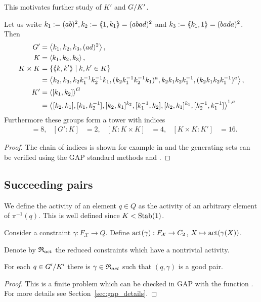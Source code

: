 \documentclass[a4paper,11pt]{amsart}
\begin{document}
This motivates further study of $K'$ and ${G/K'}$.
\begin{lem} \label{lem:subgroupsOfG}
Let us write $k_1 := (ab)^2, k_2:=\langle\negthickspace\langle1,k_1\rangle\negthickspace\rangle = (abad)^2$ and $k_3:=\langle\negthickspace\langle k_1,1\rangle\negthickspace\rangle = (bada)^2$. Then 
 \begin{align*}
  G' &= \left< k_1,k_2,k_3,(ad)^2\right>, \\
  K &= \left< k_1,k_2,k_3\right>, \\
  K\times K &= \{\langle\negthickspace\langle k,k'\rangle\negthickspace\rangle \mid k,k'\in K\} \\&= \left< k_2,k_3,k_2k_1^{-1}k_2^{-1}k_1,(k_2k_1^{-1}k_2^{-1}k_1)^a,k_2k_1k_2k_1^{-1},(k_2k_1k_2k_1^{-1})^a  \right>,\\
  K' &= \left< [k_1,k_2] \right>^G \\ 
  &= \left<[k_2,k_1],[k_1,k_2^{-1}],[k_2,k_1]^{k_2},[k_1^{-1},k_2], [k_2,k_1]^{k_1},[k_2^{-1},k_1^{-1}]\right>^{1,a} 
 \end{align*}
Furthermore these groups form a tower with indices
\begin{align*}
  [G:G']&=8, & [G':K]&=2, &[K:K\times K]&= 4, &[K\times K:K']&=16. 
\end{align*}
\end{lem}
\begin{proof}
 The chain of indices is shown for example in \cite{Bartholdi:BranchGroups} and the generating sets can be verified using the GAP standard methods
  and . 
\end{proof}

\subsection{Succeeding pairs}
\begin{defi}
 We define the activity of an element $q\in Q$ as the activity of an arbitrary element of $\pi^{-1}(q)$. 
 This is well defined since $K<\operatorname{Stab}(1)$. 
 
 Consider a constraint $\gamma\colon F_{\mathcal{X}} \to Q$. 
 Define $\operatorname{act}(\gamma): F_{\mathcal{X}}\to C_2$, $X \mapsto \operatorname{act}(\gamma(X))$.
 
 Denote by $\mathfrak{R}_{act}$ the reduced constraints which have a nontrivial activity.
\end{defi}

\begin{lem} \label{lem:existsGoodGamma}
 For each $q\in{G'/K'}$ there is $\gamma\in \mathfrak{R}_{act}$ such that $(q,\gamma)$ is a 
 good pair.
\end{lem}
\begin{proof}
 This is a finite problem which can be checked in GAP with the function .
 For more details see Section~\ref{sec:gap_details}.
\end{proof}
\end{document}
